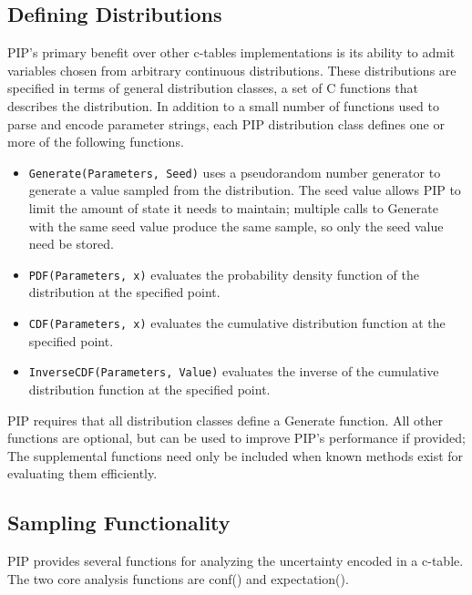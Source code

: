 \subsection{Defining Distributions}
PIP's primary benefit over other c-tables implementations is its ability to admit variables chosen from arbitrary continuous distributions.  These distributions are specified in terms of general distribution classes, a set of C functions that describes the distribution.  In addition to a small number of functions used to parse and encode parameter strings, each PIP distribution class defines one or more of the following functions.
\begin{itemize}
\footnotesize
\item \texttt{Generate(Parameters, Seed)} uses a pseudorandom number generator to generate a value sampled from the distribution.  The seed value allows PIP to limit the amount of state it needs to maintain; multiple calls to Generate with the same seed value produce the same sample, so only the seed value need be stored.
\item \texttt{PDF(Parameters, x)} evaluates the probability density function of the distribution at the specified point.  
\item \texttt{CDF(Parameters, x)} evaluates the cumulative distribution function at the specified point.
\item \texttt{InverseCDF(Parameters, Value)} evaluates the inverse of the cumulative distribution function at the specified point.
\end{itemize}

PIP requires that all distribution classes define a Generate function.  All other functions are optional, but can be used to improve PIP's performance if provided; The supplemental functions need only be included when known methods exist for evaluating them efficiently.


\subsection{Sampling Functionality}
PIP provides several functions for analyzing the uncertainty encoded in a c-table.  The two core analysis functions are conf() and expectation().

